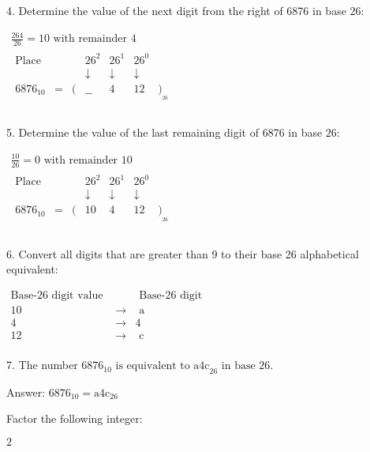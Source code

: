 \documentclass{article}
\begin{document}
4. Determine the value of the next digit from the right of 6876 in base $26:$

$\begin{array}{l}
\frac{264}{26}=10\text{ with remainder }4 \\
 
\begin{array}{ccccccc}
\text{Place }&   &   & 26^2 & 26^1 & 26^0 &   \\
   &   &   & \downarrow  & \downarrow  & \downarrow  &   \\
 6876_{10} & = & ( & \_\_ & 4 & 12 & )_{\text{}_{26}} \\
\end{array}
 \\
\end{array}$

5. Determine the value of the last remaining digit of 6876 in base $26:$

$\begin{array}{l}
\frac{10}{26}=0\text{ with remainder }10 \\
 
\begin{array}{ccccccc}
\text{Place }&   &   & 26^2 & 26^1 & 26^0 &   \\
   &   &   & \downarrow  & \downarrow  & \downarrow  &   \\
 6876_{10} & = & ( & 10 & 4 & 12 & )_{\text{}_{26}} \\
\end{array}
 \\
\end{array}$

6. Convert all digits that are greater than 9 to their base 26 alphabetical equivalent:

$\begin{array}{ccc}
\text{Base-26 digit value }&   &\text{ Base-26 digit }\\
 10 & \rightarrow  &\text{ a }\\
 4 & \rightarrow  & 4 \\
 12 & \rightarrow  &\text{ c }\\
\end{array}$

7. The number $6876_{10}\text{ is equivalent to a4c}_{26}\text{ in base }26.$

Answer: $6876_{10}=\text{a4c}_{26}$

\pagebreak

Factor the following integer:

$2$
\end{document}
